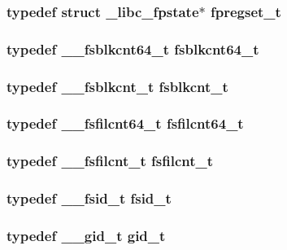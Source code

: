 \subsubsection[{fpregset\_\-t}]{\setlength{\rightskip}{0pt plus 5cm}typedef struct {\bf \_\-libc\_\-fpstate}$\ast$ {\bf fpregset\_\-t}}\label{tp_8c_a2399ee17d83ca21bc471e6ac97157151}
\subsubsection[{fsblkcnt64\_\-t}]{\setlength{\rightskip}{0pt plus 5cm}typedef {\bf \_\-\_\-fsblkcnt64\_\-t} {\bf fsblkcnt64\_\-t}}\label{tp_8c_a5be27abcad0def5d3731a4d38c6434c4}
\subsubsection[{fsblkcnt\_\-t}]{\setlength{\rightskip}{0pt plus 5cm}typedef {\bf \_\-\_\-fsblkcnt\_\-t} {\bf fsblkcnt\_\-t}}\label{tp_8c_a259e02dbd79df22bec11ea0ecad2e28b}
\subsubsection[{fsfilcnt64\_\-t}]{\setlength{\rightskip}{0pt plus 5cm}typedef {\bf \_\-\_\-fsfilcnt64\_\-t} {\bf fsfilcnt64\_\-t}}\label{tp_8c_a5dc11ca264244ab2378393bf6c5816f7}
\subsubsection[{fsfilcnt\_\-t}]{\setlength{\rightskip}{0pt plus 5cm}typedef {\bf \_\-\_\-fsfilcnt\_\-t} {\bf fsfilcnt\_\-t}}\label{tp_8c_a31e0eb7cd530717cdd080ed6323f224e}
\subsubsection[{fsid\_\-t}]{\setlength{\rightskip}{0pt plus 5cm}typedef {\bf \_\-\_\-fsid\_\-t} {\bf fsid\_\-t}}\label{tp_8c_ab9fc7229d8237501dcd371ba9875dc7f}
\subsubsection[{gid\_\-t}]{\setlength{\rightskip}{0pt plus 5cm}typedef {\bf \_\-\_\-gid\_\-t} {\bf gid\_\-t}}\label{tp_8c_a9520fe38856d436aa8c5850ff21839ec}
